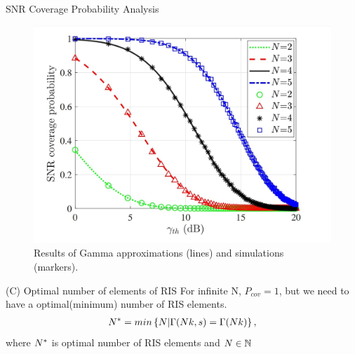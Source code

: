 \documentclass{beamer}
\begin{document}
\begin{frame}{SNR Coverage Probability Analysis}
    \begin{block}{}
        \begin{figure}
            \centering
            \includegraphics[scale = 0.11]{figures/gamma_sim_approx_different_N.jpg}
            \caption{Results of Gamma approximations (lines) and simulations (markers).}
            \label{fig:gamma_sim_approx_different_N}
        \end{figure}
    \end{block}    
    \begin{block}{(C) Optimal number of elements of RIS}
        \small{For infinite N, $P_{cov}=1$, but we need to have a optimal(minimum) number of RIS elements.
        \begin{align}
            \mathnormal{N}^* = min\left\{N|\Gamma(\mathnormal{Nk,s}) = \Gamma(\mathnormal{Nk})\right\},
        \end{align}
        where $\mathnormal{N^*}$ is optimal number of RIS elements and $\mathnormal{N} \in \mathbb{N}$}
    \end{block}
\end{frame}
\end{document}
